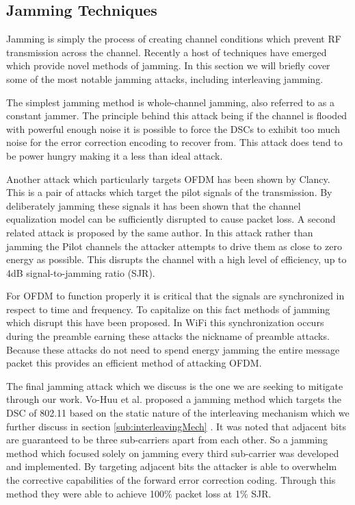 \documentclass[sigconf]{acmart}
\begin{document}
\subsection{Jamming Techniques}
\label{sec:jamming}

Jamming is simply the process of creating channel conditions which prevent RF transmission across the channel. Recently a host of techniques have emerged which provide novel methods of jamming. In this section we will briefly cover some of the most notable jamming attacks, including interleaving jamming. 

The simplest jamming method is whole-channel jamming, also referred to as a constant jammer\cite{grover2014jamming}. The principle behind this attack being if the channel is flooded with powerful enough noise it is possible to force the DSCs to exhibit too much noise for the error correction encoding to recover from. This attack does tend to be power hungry making it a less than ideal attack. 

Another attack which particularly targets OFDM has been shown by Clancy\cite{clancy2011efficient}. This is a pair of attacks which target the pilot signals of the transmission. By deliberately jamming these signals it has been shown that the channel equalization model can be sufficiently disrupted to cause packet loss. A second related attack is proposed by the same author. In this attack rather than jamming the Pilot channels the attacker attempts to drive them as close to zero energy as possible. This disrupts the channel with a high level of efficiency, up to 4dB signal-to-jamming ratio (SJR).

For OFDM to function properly it is critical that the signals are synchronized in respect to time and frequency. To capitalize on this fact methods of jamming which disrupt this have been proposed\cite{mueller2013efficient, la2013phase}. In WiFi this synchronization occurs during the preamble earning these attacks the nickname of preamble attacks. Because these attacks do not need to spend energy jamming the entire message packet this provides an efficient method of attacking OFDM.

The final jamming attack which we discuss is the one we are seeking to mitigate through our work. Vo-Huu et al. proposed a jamming method which targets the DSC of 802.11 based on the static nature of the interleaving mechanism which we further discuss in section \ref{sub:interleavingMech} \cite{vo2016interleaving}. It was noted that adjacent bits are guaranteed to be three sub-carriers apart from each other. So a jamming method which focused solely on jamming every third sub-carrier was developed and implemented. By targeting adjacent bits the attacker is able to overwhelm the corrective capabilities of the forward error correction coding. Through this method they were able to achieve 100\% packet loss at 1\% SJR. 
\end{document}
